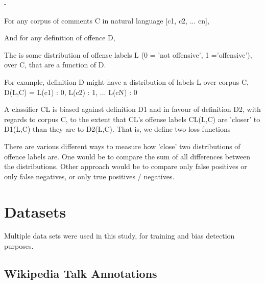 \documentclass[runningheads,a4paper]{llncs}
\begin{document}
-

For any corpus of comments C in natural language [c1, c2, ... cn],

And for any definition of offence D,

The is some distribution of offense labels L (0 = 'not offensive', 1 ='offensive'), over C, that are a function of D.

For example, definition D might have a distribution of labels L over corpus C, D(L,C) = {L(c1) : 0, L(c2) : 1, ... L(cN) : 0}

A classifier CL is biased​ against definition D1 and in favour of definition D2, with regards to corpus C, to the extent that CL's offense labels CL(L,C) are 'closer' to D1(L,C) than they are to D2(L,C). That is, we define two loss functions

There are various different ways to measure how 'close' two distributions of offence labels are. One would be to compare the sum of all differences between the distributions. Other approach would be to compare only false positives or only false negatives, or only true positives / negatives.



 
\section{Datasets}
Multiple data sets were used in this study, for training and bias detection purposes.

\subsection{Wikipedia Talk Annotations}
\end{document}
